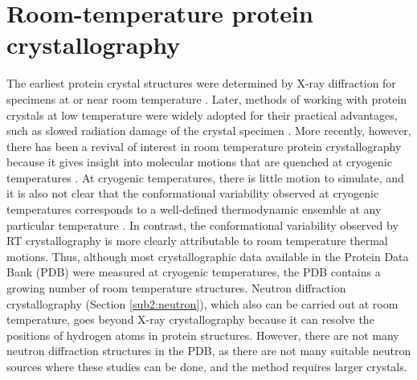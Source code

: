 \documentclass[9pt,review,pubversion]{livecoms}
\begin{document}
\section{Room-temperature protein crystallography}
\label{sec:xtal}

The earliest protein crystal structures were determined by X-ray diffraction for specimens at or near room temperature \cite{muirhead_structure_1963}.
Later, methods of working with protein crystals at low temperature were widely adopted for their practical advantages, such as slowed radiation damage of the crystal specimen \cite{fischer_macromolecular_2021,thorne_determining_2023}.
More recently, however, there has been a revival of interest in room temperature protein crystallography because it gives insight into molecular motions that are quenched at cryogenic temperatures \cite{fraser_hidden_2009,keedy_crystal_2014,fischer_macromolecular_2021,thorne_determining_2023}.
At cryogenic temperatures, there is little motion to simulate, and it is also not clear that the conformational variability observed at cryogenic temperatures corresponds to a well-defined thermodynamic ensemble at any particular temperature \cite{keedy_crystal_2014,bradford_temperature_2021}.
In contrast, the conformational variability observed by RT crystallography is more clearly attributable to room temperature thermal motions.
Thus, although most crystallographic data available in the Protein Data Bank (PDB) were measured at cryogenic temperatures, the PDB contains a growing number of room temperature structures.
Neutron diffraction crystallography (Section \ref{sub2:neutron}), which also can be carried out at room temperature, goes beyond X-ray crystallography because it can resolve the positions of hydrogen atoms in protein structures.
However, there are not many neutron diffraction structures in the PDB, as there are not many suitable neutron sources where these studies can be done, and the method requires larger crystals.
\end{document}
